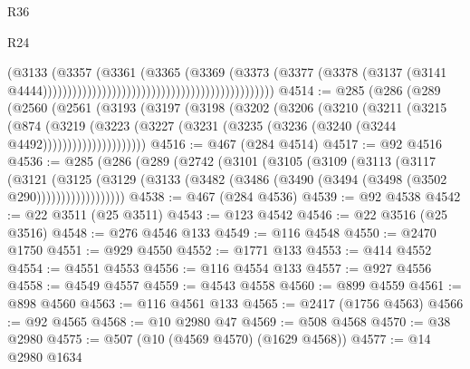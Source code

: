 \begin{lexlean}{R36}
\begin{lexlean}{R24}
\begin{coremodule}
{{{{{{{{{{{{{{{{{{{{{{{{{{{{{{{{{{{{{{{{{{{{{{{{{{{{{{{{{{{{{{{{{{{{{{{{{{{{{{{{{{{{{{{{{{{{{{{{{{{{{{{{{{{{{{{{{{{{{{{{{{{{{{{{{{{{{{{{{{{{{{{{{{{{{{{{{{{{{{{{{{{{{{{{{{{{{{{{{{{{{{{{{{{{{{{{{{{                                                                              (@3133
                                                                                (@3357
                                                                                  (@3361
                                                                                    (@3365
                                                                                      (@3369
                                                                                        (@3373
                                                                                          (@3377
                                                                                            (@3378
                                                                                              (@3137
                                                                                                (@3141
                                                                                                  @4444)))))))))))))))))))))))))))))))))))))))))))))))
@4514 := @285
    (@286
      (@289
        (@2560
          (@2561
            (@3193
              (@3197
                (@3198
                  (@3202
                    (@3206
                      (@3210
                        (@3211
                          (@3215
                            (@874
                              (@3219
                                (@3223
                                  (@3227
                                    (@3231 (@3235 (@3236 (@3240 (@3244 @4492)))))))))))))))))))))
@4516 := @467 (@284 @4514)
@4517 := @92 @4516
@4536 := @285
    (@286
      (@289
        (@2742
          (@3101
            (@3105
              (@3109
                (@3113
                  (@3117
                    (@3121
                      (@3125
                        (@3129
                          (@3133 (@3482 (@3486 (@3490 (@3494 (@3498 (@3502 @290))))))))))))))))))
@4538 := @467 (@284 @4536)
@4539 := @92 @4538
@4542 := @22 @3511 (@25 @3511)
@4543 := @123 @4542
@4546 := @22 @3516 (@25 @3516)
@4548 := @276 @4546 @133
@4549 := @116 @4548
@4550 := @2470 @1750
@4551 := @929 @4550
@4552 := @1771 @133
@4553 := @414 @4552
@4554 := @4551 @4553
@4556 := @116 @4554 @133
@4557 := @927 @4556
@4558 := @4549 @4557
@4559 := @4543 @4558
@4560 := @899 @4559
@4561 := @898 @4560
@4563 := @116 @4561 @133
@4565 := @2417 (@1756 @4563)
@4566 := @92 @4565
@4568 := @10 @2980 @47
@4569 := @508 @4568
@4570 := @38 @2980
@4575 := @507 (@10 (@4569 @4570) (@1629 @4568))
@4577 := @14 @2980 @1634
}}}}}}}}}}}}}}}}}}}}}}}}}}}}}}}}}}}}}}}}}}}}}}}}}}}}}}}}}}}}}}}}}}}}}}}}}}}}}}}}}}}}}}}}}}}}}}}}}}}}}}}}}}}}}}}}}}}}}}}}}}}}}}}}}}}}}}}}}}}}}}}}}}}}}}}}}}}}}}}}}}}}}}}}}}}}}}}}}}}}}}}}}}}}}}}}}}}
\end{coremodule}
\end{lexlean}
\end{lexlean}
